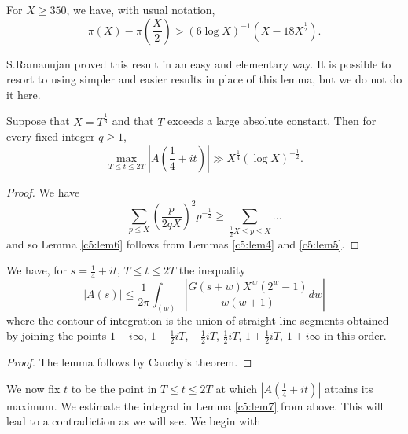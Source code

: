 \begin{lem}\label{c5:lem5}
For $X\geq 350$, we have, with usual notation,
\begin{equation*}
\pi(X)-\pi\left(\frac{X}{2}\right)>(6\log
X)^{-1}(X-18X^{\frac{1}{2}}).\tag{5.2.8}\label{c5:eq5.2.8} 
\end{equation*}
\end{lem}

\begin{remark*}
S.\@ Ramanujan proved this result in an easy and elementary way. It is
possible to resort to using simpler and easier results in place of
this lemma, but we do not do it here.
\end{remark*}

\begin{lem}\label{c5:lem6}
Suppose that $X=T^{\frac{1}{3}}$ and that $T$ exceeds a large absolute
constant. Then for every fixed integer $q\geq 1$,
\begin{equation*}
\max\limits_{T\leq t\leq 2T}|A\left(\frac{1}{4}+it\right)|\gg
X^{\frac{1}{4}}(\log
X)^{-\frac{1}{2}}.\tag{5.2.9}\label{c5:eq5.2.9} 
\end{equation*}
\end{lem}

\begin{proof}
We have
$$
\sum_{p\leq X}\left(\frac{p}{2qX}\right)^{2}p^{-\frac{1}{2}}\geq
\sum_{\frac{1}{2}X\leq p\leq X}\ldots
$$
and so Lemma \ref{c5:lem6} follows from Lemmas \ref{c5:lem4} and
\ref{c5:lem5}. 
\end{proof}

\begin{lem}\label{c5:lem7}
We have, for $s=\frac{1}{4}+it$, $T\leq t\leq 2T$ the inequality
\begin{equation*}
|A(s)|\leq
\frac{1}{2\pi}\int_{(w)}|\frac{G(s+w)X^{w}(2^{w}-1)}{w(w+1)}dw|\tag{5.2.10}\label{c5:eq5.2.10} 
\end{equation*}
where the contour of integration is the union of straight line
segments obtained by joining the points $1-i\infty$,
$1-\frac{1}{2}iT$, $-\frac{1}{2}iT$, $\frac{1}{2}iT$,
$1+\frac{1}{2}iT$, $1+i\infty$ in this order.
\end{lem}

\begin{proof}
The lemma follows by Cauchy's theorem.
\end{proof}

We now fix $t$ to be the point in $T\leq t\leq 2T$ at which
$|A(\frac{1}{4}+it)|$ attains its maximum. We estimate the integral in
Lemma \ref{c5:lem7} from above. This will lead to a contradiction
as we will see. We begin with

